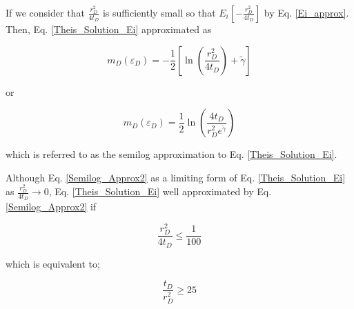 \documentclass{llncs}
\numberwithin{equation}{section}
\numberwithin{figure}{section}
\numberwithin{table}{section}
\begin{document}
    If we consider that $\frac{r_{D}^{2}}{4{{t}_{D}}}$ is sufficiently small so that  ${{E}_{i}}\left[ -\frac{r_{D}^{2}}{4{{t}_{D}}} \right]$  by Eq. \ref{Ei_approx}. Then, Eq. \ref{Theis_Solution_Ei}  approximated as

    \begin{equation}
        {{ m }_{D}}\left( {{\varepsilon }_{D}} \right)=-\frac{1}{2}\left[ \ln \left( \frac{r_{D}^{2}}{4{{t}_{D}}} \right)+\widetilde{\gamma } \right]
        \label{Semilog_Approx1}
    \end{equation}

    or

    \begin{equation}
        {{ m }_{D}}\left( {{\varepsilon }_{D}} \right)=\frac{1}{2}\ln \left( \frac{4{{t}_{D}}}{r_{D}^{2}{{e}^{\widetilde{\gamma }}}} \right)
        \label{Semilog_Approx2}
    \end{equation}

    which is referred to as the semilog approximation to Eq. \ref{Theis_Solution_Ei}.

    Although Eq. \ref{Semilog_Approx2}  as a limiting form of Eq. \ref{Theis_Solution_Ei} as $\frac{r_{D}^{2}}{4{{t}_{D}}}\to 0$, Eq. \ref{Theis_Solution_Ei}  well approximated by Eq. \ref{Semilog_Approx2} if

    \begin{equation*}
        \frac{r_{D}^{2}}{4{{t}_{D}}}\le \frac{1}{100}
    \end{equation*}

    which is equivalent to;

    \begin{equation}
        \frac{{{t}_{D}}}{r_{D}^{2}}\ge 25
        \label{Semilog_Approx2}
    \end{equation}
    
\end{document}
